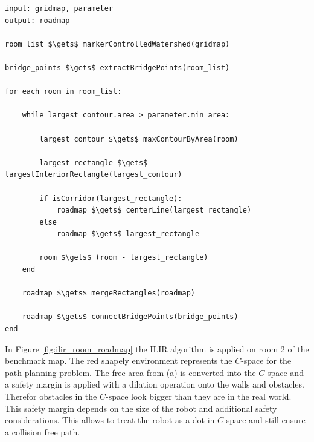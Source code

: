 \begin{lstlisting}[float=h]
input: gridmap, parameter
output: roadmap

room_list $\gets$ markerControlledWatershed(gridmap)

bridge_points $\gets$ extractBridgePoints(room_list)

for each room in room_list:

    while largest_contour.area > parameter.min_area:
    
        largest_contour $\gets$ maxContourByArea(room)
            
        largest_rectangle $\gets$ largestInteriorRectangle(largest_contour)

        if isCorridor(largest_rectangle):
            roadmap $\gets$ centerLine(largest_rectangle)
        else
            roadmap $\gets$ largest_rectangle

        room $\gets$ (room - largest_rectangle)
    end

    roadmap $\gets$ mergeRectangles(roadmap)
    
    roadmap $\gets$ connectBridgePoints(bridge_points)
end
\end{lstlisting}

In Figure \ref{fig:ilir_room_roadmap} the ILIR algorithm is applied on room 2 of the benchmark map. The red shapely environment represents the \(C\)-space for the path planning problem. The free area from (a) is converted into the \(C\)-space and a safety margin is applied with a dilation operation onto the walls and obstacles.  Therefor obstacles in the \(C\)-space look bigger than they are in the real world. This safety margin depends on the size of the robot and additional safety considerations. This allows to treat the robot as a dot in \(C\)-space and still ensure a collision free path. 


